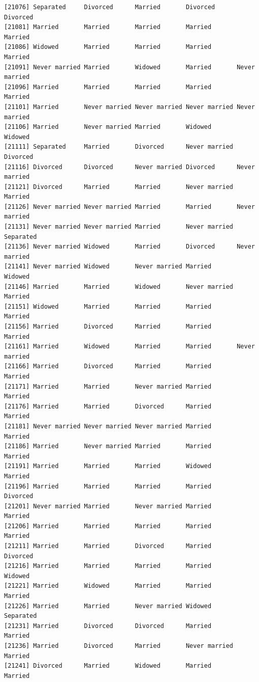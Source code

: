 \documentclass[
  letterpaper,
  DIV=11,
  numbers=noendperiod,
  oneside]{scrartcl}
\begin{document}
\begin{verbatim}
[21076] Separated     Divorced      Married       Divorced      Divorced     
[21081] Married       Married       Married       Married       Married      
[21086] Widowed       Married       Married       Married       Married      
[21091] Never married Married       Widowed       Married       Never married
[21096] Married       Married       Married       Married       Married      
[21101] Married       Never married Never married Never married Never married
[21106] Married       Never married Married       Widowed       Widowed      
[21111] Separated     Married       Divorced      Never married Divorced     
[21116] Divorced      Divorced      Never married Divorced      Never married
[21121] Divorced      Married       Married       Never married Married      
[21126] Never married Never married Married       Married       Never married
[21131] Never married Never married Married       Never married Separated    
[21136] Never married Widowed       Married       Divorced      Never married
[21141] Never married Widowed       Never married Married       Widowed      
[21146] Married       Married       Widowed       Never married Married      
[21151] Widowed       Married       Married       Married       Married      
[21156] Married       Divorced      Married       Married       Married      
[21161] Married       Widowed       Married       Married       Never married
[21166] Married       Divorced      Married       Married       Married      
[21171] Married       Married       Never married Married       Married      
[21176] Married       Married       Divorced      Married       Married      
[21181] Never married Never married Never married Married       Married      
[21186] Married       Never married Married       Married       Married      
[21191] Married       Married       Married       Widowed       Married      
[21196] Married       Married       Married       Married       Divorced     
[21201] Never married Married       Never married Married       Married      
[21206] Married       Married       Married       Married       Married      
[21211] Married       Married       Divorced      Married       Divorced     
[21216] Married       Married       Married       Married       Widowed      
[21221] Married       Widowed       Married       Married       Married      
[21226] Married       Married       Never married Widowed       Separated    
[21231] Married       Divorced      Divorced      Married       Married      
[21236] Married       Divorced      Married       Never married Married      
[21241] Divorced      Married       Widowed       Married       Married      

\end{verbatim}
\end{document}
